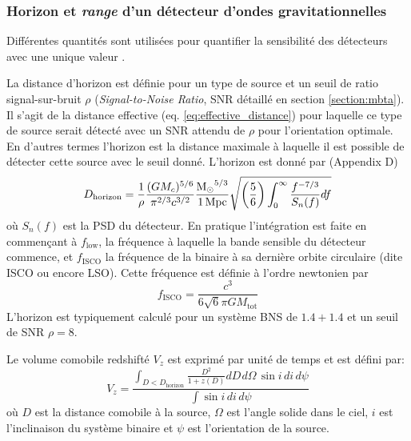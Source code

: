 \subsubsection{Horizon et \textit{range} d'un détecteur d'ondes gravitationnelles}

Différentes quantités sont utilisées pour quantifier la sensibilité des détecteurs avec une unique valeur \cite{findchirp,distances,one_ifo}.

La distance d'horizon est définie pour un type de source et un seuil de ratio signal-sur-bruit $\rho$ (\textit{Signal-to-Noise Ratio}, SNR détaillé en section \ref{section:mbta}).
Il s'agit de la distance effective (eq. \ref{eq:effective_distance}) pour laquelle ce type de source serait détecté avec un SNR attendu de $\rho$ pour l'orientation optimale.
En d'autres termes l'horizon est la distance maximale à laquelle il est possible de détecter cette source avec le seuil donné.
L'horizon est donné par \cite{findchirp} (Appendix D)
\begin{equation}
  D_{\textrm{horizon}} = \frac{1}{\rho} \frac{(GM_c)^{5/6}}{\pi^{2/3}c^{3/2}} \frac{\textrm{M$_{\odot}$}^{5/3}}{\textrm{\SI{1}{Mpc}}} \sqrt{\left(\frac{5}{6}\right) \int_{0}^{\infty}\frac{f^{-7/3}}{S_n(f)}df}
  \label{eq:horizon}
\end{equation}
où $S_n(f)$ est la PSD du détecteur.
En pratique l'intégration est faite en commençant à $f_{\textrm{low}}$, la fréquence à laquelle la bande sensible du détecteur commence, et $f_{\textrm{ISCO}}$ la fréquence de la binaire à sa dernière orbite circulaire (dite ISCO ou encore LSO).
Cette fréquence est définie à l'ordre newtonien par
\begin{equation}
  f_{\textrm{ISCO}} = \frac{c^3}{6\sqrt{6}\pi G M_{\textrm{tot}}}
  \label{eq:f_isco}
\end{equation}
L'horizon est typiquement calculé pour un système BNS de $1.4+1.4$ \msun et un seuil de SNR $\rho=8$.

Le volume comobile redshifté $V_z$  est exprimé par unité de temps \cite{distances} et est défini par:
\begin{equation}
  V_z = \frac{ \int_{D<D_{\textrm{horizon}}} \frac{D^2}{1+z(D)} dD \hspace{1pt} d\Omega \hspace{2pt} \sin i \hspace{2pt} di \hspace{2pt} d\psi}{\int \sin i \hspace{2pt} di \hspace{2pt} d\psi}
\end{equation}
où $D$ est la distance comobile à la source, $\Omega$ est l'angle solide dans le ciel, $i$ est l'inclinaison du système binaire et $\psi$ est l'orientation de la source.

